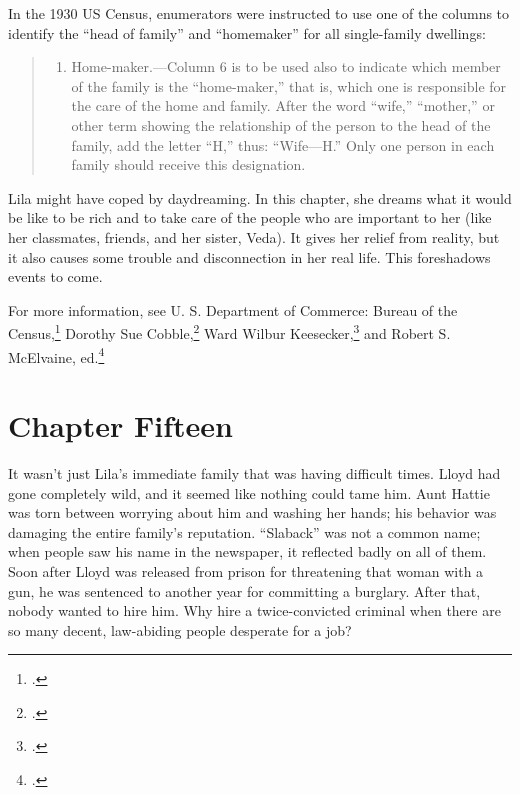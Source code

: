 \documentclass[
  american,
  letterpaper,
]{book}
\providecommand{\tightlist}{%
  \setlength{\itemsep}{0pt}\setlength{\parskip}{0pt}}\usepackage{longtable,booktabs,array}
\begin{document}
In the 1930 US Census, enumerators were instructed to use one of the
columns to identify the ``head of family'' and ``homemaker'' for all
single-family dwellings:

\begin{quote}
\begin{enumerate}
\def\labelenumi{\arabic{enumi}.}
\setcounter{enumi}{131}
\tightlist
\item
  Home-maker.---Column 6 is to be used also to indicate which member of
  the family is the ``home-maker,'' that is, which one is responsible
  for the care of the home and family. After the word ``wife,''
  ``mother,'' or other term showing the relationship of the person to
  the head of the family, add the letter ``H,'' thus: ``Wife---H.'' Only
  one person in each family should receive this designation.
\end{enumerate}
\end{quote}

Lila might have coped by daydreaming. In this chapter, she dreams what
it would be like to be rich and to take care of the people who are
important to her (like her classmates, friends, and her sister, Veda).
It gives her relief from reality, but it also causes some trouble and
disconnection in her real life. This foreshadows events to come.

For more information, see U. S. Department of Commerce: Bureau of the
Census,\footnote{.} Dorothy Sue
Cobble,\footnote{.} Ward Wilbur
Keesecker,\footnote{.} and Robert S. McElvaine,
ed.\footnote{.}


\chapter{Chapter Fifteen}\label{chapter-fifteen}

It wasn't just Lila's immediate family that was having difficult times.
Lloyd had gone completely wild, and it seemed like nothing could tame
him. Aunt Hattie was torn between worrying about him and washing her
hands; his behavior was damaging the entire family's reputation.
``Slaback'' was not a common name; when people saw his name in the
newspaper, it reflected badly on all of them. Soon after Lloyd was
released from prison for threatening that woman with a gun, he was
sentenced to another year for committing a burglary. After that, nobody
wanted to hire him. Why hire a twice-convicted criminal when there are
so many decent, law-abiding people desperate for a job?
\end{document}

